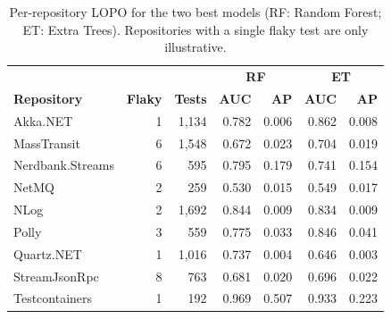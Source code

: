 \begin{table}[!h]
\caption{Per-repository LOPO for the two best models (RF: Random Forest; ET: Extra Trees). Repositories with a single flaky test are only illustrative.}
\label{tab:lopo-repo}
\centering
\scriptsize
\setlength{\tabcolsep}{4pt}
\begin{tabular}{@{}lrrrrrr@{}}
\hline\hline
 & & & \multicolumn{2}{c}{\textbf{RF}} & \multicolumn{2}{c}{\textbf{ET}} \\
\textbf{Repository} & \textbf{Flaky} & \textbf{Tests} & \textbf{AUC} & \textbf{AP} & \textbf{AUC} & \textbf{AP} \\
\hline
Akka.NET         & 1 & 1,134 & 0.782 & 0.006 & 0.862 & 0.008 \\
MassTransit      & 6 & 1,548 & 0.672 & 0.023 & 0.704 & 0.019 \\
Nerdbank.Streams & 6 &   595 & 0.795 & 0.179 & 0.741 & 0.154 \\
NetMQ            & 2 &   259 & 0.530 & 0.015 & 0.549 & 0.017 \\
NLog             & 2 & 1,692 & 0.844 & 0.009 & 0.834 & 0.009 \\
Polly            & 3 &   559 & 0.775 & 0.033 & 0.846 & 0.041 \\
Quartz.NET       & 1 & 1,016 & 0.737 & 0.004 & 0.646 & 0.003 \\
StreamJsonRpc    & 8 &   763 & 0.681 & 0.020 & 0.696 & 0.022 \\
Testcontainers   & 1 &   192 & 0.969 & 0.507 & 0.933 & 0.223 \\
\hline\hline
\end{tabular}
\end{table}

